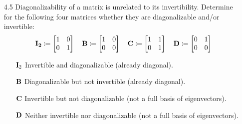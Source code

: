 \documentclass[11pt]{article}
\begin{document}
\begin{enumerate}
    \item[4.5] Diagonalizability of a matrix is unrelated to its invertibility.  Determine for the
          following four matrices whether they are diagonalizable and/or invertible:
          \[
              \mathbf{I_2} \coloneq
              \begin{bmatrix}
                  1 & 0 \\
                  0 & 1 \\
              \end{bmatrix}
              \quad
              \mathbf{B} \coloneq
              \begin{bmatrix}
                  1 & 0 \\
                  0 & 0 \\
              \end{bmatrix}
              \quad
              \mathbf{C} \coloneq
              \begin{bmatrix}
                  1 & 1 \\
                  0 & 1 \\
              \end{bmatrix}
              \quad
              \mathbf{D} \coloneq
              \begin{bmatrix}
                  0 & 1 \\
                  0 & 0 \\
              \end{bmatrix}
          \]
          \begin{enumerate}[align=left]
              \item[$\mathbf{I}_2$] Invertible and diagonalizable (already diagonal).
              \item[$\mathbf{B}$] Diagonalizable but not invertible (already diagonal).
              \item[$\mathbf{C}$] Invertible but not diagonalizable (not a full basis of eigenvectors).
              \item[$\mathbf{D}$] Neither invertible nor diagonalizable (not a full basis of eigenvectors).
          \end{enumerate}

          \pagebreak


\end{enumerate}
\end{document}
